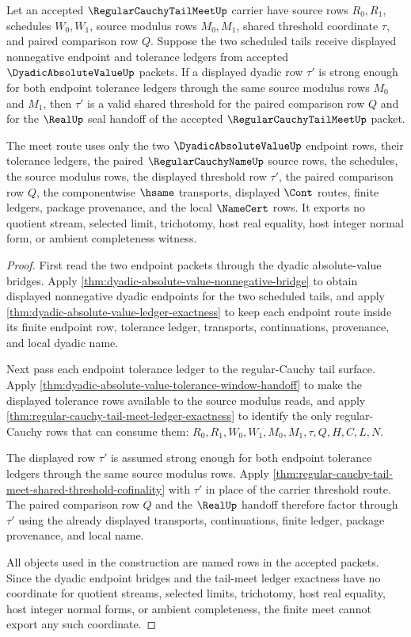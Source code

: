 \begin{theorem}
\label{thm:regular-cauchy-tail-meet-dyadic-endpoint-meet}
Let an accepted $\RegularCauchyTailMeetUp$ carrier have source rows $R_0,R_1$, schedules $W_0,W_1$, source modulus rows $M_0,M_1$, shared threshold coordinate $\tau$, and paired comparison row $Q$. Suppose the two scheduled tails receive displayed nonnegative endpoint and tolerance ledgers from accepted $\DyadicAbsoluteValueUp$ packets. If a displayed dyadic row $\tau'$ is strong enough for both endpoint tolerance ledgers through the same source modulus rows $M_0$ and $M_1$, then $\tau'$ is a valid shared threshold for the paired comparison row $Q$ and for the $\RealUp$ seal handoff of the accepted $\RegularCauchyTailMeetUp$ packet.

The meet route uses only the two $\DyadicAbsoluteValueUp$ endpoint rows, their tolerance ledgers, the paired $\RegularCauchyNameUp$ source rows, the schedules, the source modulus rows, the displayed threshold row $\tau'$, the paired comparison row $Q$, the componentwise $\hsame$ transports, displayed $\Cont$ routes, finite ledgers, package provenance, and the local $\NameCert$ rows. It exports no quotient stream, selected limit, trichotomy, host real equality, host integer normal form, or ambient completeness witness.
\end{theorem}
\begin{proof}
First read the two endpoint packets through the dyadic absolute-value bridges. Apply \autoref{thm:dyadic-absolute-value-nonnegative-bridge} to obtain displayed nonnegative dyadic endpoints for the two scheduled tails, and apply \autoref{thm:dyadic-absolute-value-ledger-exactness} to keep each endpoint route inside its finite endpoint row, tolerance ledger, transports, continuations, provenance, and local dyadic name.

Next pass each endpoint tolerance ledger to the regular-Cauchy tail surface. Apply \autoref{thm:dyadic-absolute-value-tolerance-window-handoff} to make the displayed tolerance rows available to the source modulus reads, and apply \autoref{thm:regular-cauchy-tail-meet-ledger-exactness} to identify the only regular-Cauchy rows that can consume them: $R_0,R_1,W_0,W_1,M_0,M_1,\tau,Q,H,C,L,N$.

The displayed row $\tau'$ is assumed strong enough for both endpoint tolerance ledgers through the same source modulus rows. Apply \autoref{thm:regular-cauchy-tail-meet-shared-threshold-cofinality} with $\tau'$ in place of the carrier threshold route. The paired comparison row $Q$ and the $\RealUp$ handoff therefore factor through $\tau'$ using the already displayed transports, continuations, finite ledger, package provenance, and local name.

All objects used in the construction are named rows in the accepted packets. Since the dyadic endpoint bridges and the tail-meet ledger exactness have no coordinate for quotient streams, selected limits, trichotomy, host real equality, host integer normal forms, or ambient completeness, the finite meet cannot export any such coordinate.
\end{proof}

